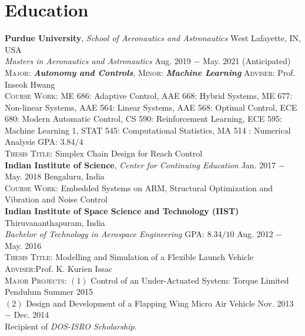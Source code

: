\documentclass[letterpaper,10pt]{article}
\begin{document}
\section{Education}
\noindent \textbf{Purdue University}, \textit{School of Aeronautics and Astronautics} \hfill West Lafayette, IN, USA \\
\textit{Masters in Aeronautics and Astronautics} \hfill Aug. 2019 $-$ May. 2021 (Anticipated)\\
\textsc{Major}: \textit{\textbf{Autonomy and Controls}}, \textsc{Minor}: \textit{\textbf{Machine Learning}} \hfill \textsc{Adviser}: Prof. Inseok Hwang\\
\textsc{Course Work}: ME 686: Adaptive Control, AAE 668: Hybrid Systems, ME 677: Non-linear Systems, AAE 564: Linear Systems,  AAE 568: Optimal Control, ECE 680: Modern Automatic Control, CS 590: Reinforcement Learning, ECE 595: Machine Learning 1, STAT 545: Computational Statistics, MA 514 : Numerical Analysis
\hfill \textsc{GPA}: $3.84/4$\\
\textsc{Thesis Title}: Simplex Chain Design for Reach Control \\

\vspace{5pt}
\noindent \textbf{Indian Institute of Science}, \textit{Center for Continuing Education} \hfill Jan. 2017 $-$ May. 2018  \hfill Bengaluru, India \\
\textsc{Course Work:} Embedded Systems on ARM, Structural Optimization and Vibration and Noise Control \\

\vspace{5pt}
\noindent \textbf{Indian Institute of Space Science and Technology (IIST)} \hfill Thiruvananthapuram, India\\
\textit{Bachelor of Technology in Aerospace Engineering} \hfill \textsc{GPA}: $8.34/10$ \hfill Aug. 2012 $-$ May. 2016 \\
\textsc{Thesis Title}: Modelling and Simulation of a Flexible Launch Vehicle
\hfill \textsc{Adviser}:Prof. K. Kurien Issac \\
\textsc{Major Projects}: $(1)$ Control of an Under-Actuated System: Torque Limited Pendulum \hfill {Summer 2015}\\
$(2)$ Design and Development of a Flapping Wing Micro Air Vehicle \hfill {Nov. 2013 $-$ Dec. 2014}\\
Recipient of \textit{DOS-ISRO Scholarship}.


\end{document}
